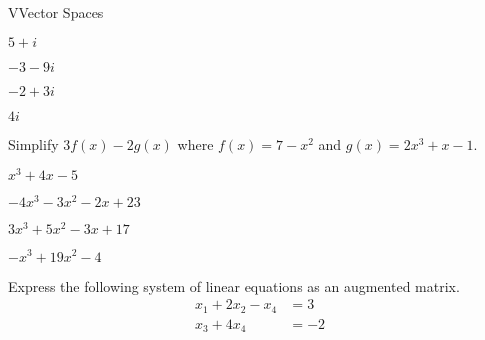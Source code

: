 \documentclass{article}[12pt]
\begin{document}
\begin{module}{V}{Vector Spaces}
\begin{readinessAssuranceTest}
  \begin{multicols}{4}
  \begin{readinessAssuranceTestChoices}
  \item \(5+i\)
  \item \(-3-9i\)
  \item \(-2+3i\) %
  \item \(4i\)
  \end{readinessAssuranceTestChoices}
  \end{multicols}

  \item Simplify \(3f(x)-2g(x)\) where
        \(f(x)=7-x^2\) and
        \(g(x)=2x^3+x-1\).

  \begin{multicols}{4}
  \begin{readinessAssuranceTestChoices}
  \item \(x^3+4x-5\)
  \item \(-4x^3-3x^2-2x+23\) %
  \item \(3x^3+5x^2-3x+17\)
  \item \(-x^3+19x^2-4\)
  \end{readinessAssuranceTestChoices}
  \end{multicols}

  \item Express the following system of linear equations as an augmented matrix.
  \begin{align*}
    x_1 + 2x_2      -  x_4 &= 3 \\
               x_3 + 4x_4 &= -2
  \end{align*}


\end{readinessAssuranceTest}
\end{module}
\end{document}
